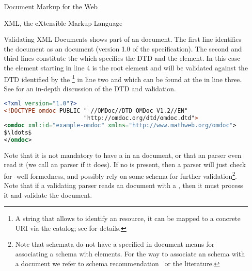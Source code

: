 \begin{tchapter}[id=markup-web]{Document Markup for the Web}
\begin{tsection}[id=xml]{XML, the eXtensible Markup Language}
\begin{tsubsection}[id=xml-validation,short=Validating XML Doucments]{Validating XML Documents}
  {} shows part of an {\omdoc} document. The first line identifies the
  document as an {\xml} document (version 1.0 of the {\xml} specification).  The second
  and third lines constitute the {} which specifies
  the DTD and the {} element. In this case the {}
  element starting in line 4 is the root element and will be validated against the DTD
  identified by the {}\footnote{A string that allows to
    identify an {\xml} resource, it can be mapped to a concrete URI via the {\xml}
    catalog; see {} for details.} in line two and
  which can be found at the {} in line three. See {}
  for an in-depth discussion of the {\omdoc} DTD and validation.

\begin{lstlisting}[label=lst:xml-dtd,language=XML,morekeywords={omdoc},mathescape,
  caption={The Structure of an {\xml} Document with DTD},
  index={xml,DOCTYPE,omdoc}
  index={[2]xmlns,xmlns:xsi,xsi:schemaLocation}]
<?xml version="1.0"?> 
<!DOCTYPE omdoc PUBLIC "-//OMDoc//DTD OMDoc V1.2//EN"
                       "http://omdoc.org/dtd/omdoc.dtd"> 
<omdoc xml:id="example-omdoc" xmlns="http://www.mathweb.org/omdoc"> 
$\ldots$
</omdoc>
\end{lstlisting}
  Note that it is not mandatory to have a {} in an
  {\xml} document, or that an {\xml} parser even read it (we call an {\xml} parser
  {} if it does). If no
  {} is present, then a parser will just check for
  {\xml}-well-formedness, and possibly rely on some schema for further
  validation\footnote{Note that {\relaxng} schemata do not have a specified in-document
    means for associating a schema with elements. For the way to associate an {\xml}
    schema with a document we refer to {\xml} schema recommendation~\cite{XML:Schema} or
    the {\xml} literature.}.  Note that if a validating parser reads an {\xml} document
  with a {}, then it must process it and validate the
  document.


\end{tsubsection}
\end{tsection}
\end{tchapter}
